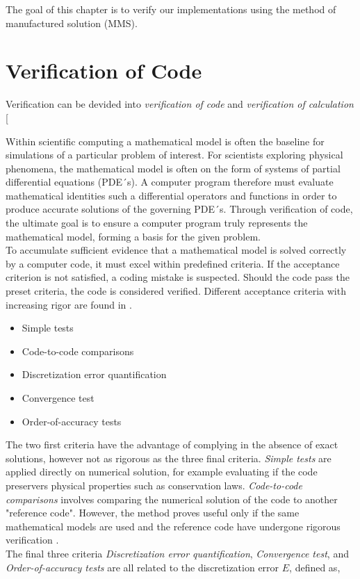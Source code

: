 
The goal of this chapter is to verify our implementations using the method of manufactured solution  (MMS).

\section{Verification of Code}
Verification can be devided into \textit{verification of code} and \textit{verification of calculation} [\cite{Roache2002} \cite{Oberkampf2010}


Within scientific computing a mathematical model is often the baseline for simulations of a particular problem of interest. For scientists exploring physical phenomena, the mathematical model is often on the form of systems of partial differential equations (PDE´s). A computer program therefore must evaluate  mathematical identities such a differential operators and functions in order to produce accurate solutions of the governing PDE´s. 
Through verification of code, the ultimate goal is to ensure a computer program truly represents the mathematical model, forming a basis for the given problem. \\
To accumulate sufficient evidence that a mathematical model is solved correctly by a computer code,  it must excel within predefined criteria. If the acceptance criterion is not satisfied, a coding mistake is suspected. Should the code pass the preset criteria, the code is considered verified. Different acceptance criteria with increasing rigor are found in \cite{Roache}.

\begin{itemize}
\item Simple tests
\item Code-to-code comparisons
\item Discretization error quantification
\item Convergence test
\item Order-of-accuracy tests
\end{itemize} 

The two first criteria have the advantage of complying  in the absence of exact solutions, however not as rigorous as the three final criteria. \textit{Simple tests} are applied directly on numerical solution, for example evaluating if the code preservers physical properties such as conservation laws. \textit{Code-to-code comparisons} involves comparing the numerical solution of the code to another "reference code".  However, the method proves useful only  if the same mathematical models are used and the reference code have undergone rigorous verification \cite{Roache}. \\
The final three criteria \textit{Discretization error quantification}, \textit{Convergence test}, and \textit{Order-of-accuracy tests} are all related to the discretization error  $E$, defined as,

